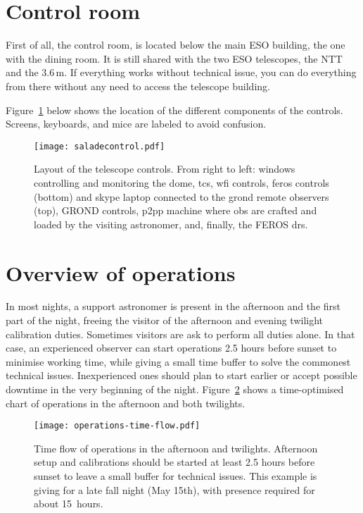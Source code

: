 \documentclass[11pt,fleqn]{book} %
\begin{document}
\section{Control room}

First of all, the control room, is located below the main ESO building, the one with the dining room.  It is still shared with the two ESO telescopes, the NTT and the 3.6\,m. If everything works without technical issue, you can do everything from there without any need to access the telescope building.

Figure~\ref{fig:saladecontrol}  below shows the location of the different components of the controls.  Screens, keyboards, and mice are labeled to avoid confusion.

\begin{figure}[!ht] \texttt{[image: saladecontrol.pdf]}
\caption[Layout of the telescope controls]{Layout of the telescope controls.  From right to left: \gls{windows} 
controlling and monitoring the dome, \acrlong{tcs}, \acrshort{wfi} controls,
\acrshort{feros} controls (bottom) and skype laptop connected to the \acrshort{grond}
remote observers (top), GROND controls, \acrshort{p2pp} machine where
\acrshort{ob}s are crafted and loaded by the visiting astronomer, and,
finally, the FEROS \acrlong{drs}.}
\label{fig:saladecontrol} 
\end{figure}

\section{Overview of operations}

In most nights, a support astronomer is present in the afternoon and the first part of the night, freeing the visitor of the afternoon and evening twilight calibration duties.  Sometimes visitors are ask to perform all duties alone.  In that case, an experienced observer can start operations 2.5 hours before sunset to minimise working time, while giving a small time buffer to solve the commonest technical issues.  Inexperienced ones should plan to start earlier or accept possible downtime in the very beginning of the night. Figure~\ref{fig:timeflow} shows a time-optimised chart of operations in the afternoon and both twilights.

\begin{figure}[!ht]
\texttt{[image: operations-time-flow.pdf]}
\caption{Time flow of operations in the afternoon and twilights. Afternoon setup and calibrations should be started at least 2.5 hours before sunset to leave a small buffer for technical issues. This example is giving for a late fall night (May 15th), with presence required for about 15~hours.}
\label{fig:timeflow}
\end{figure}
\end{document}
